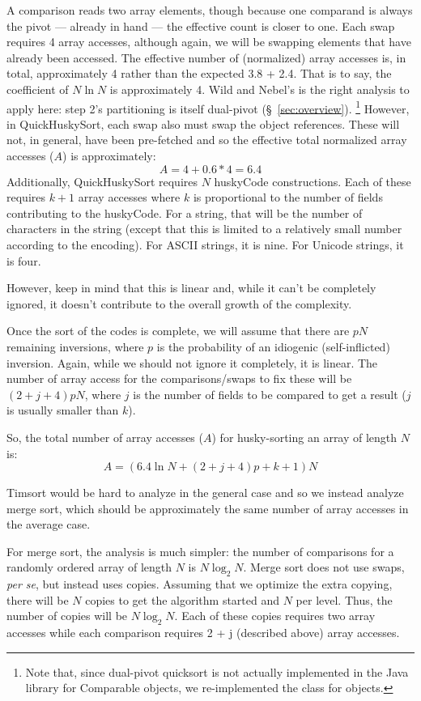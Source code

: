 \documentclass[twoside,leqno,twocolumn]{article}
\begin{document}
A comparison reads two array elements, though because one comparand is always the pivot --- already
in hand --- the effective count is closer to one.
Each swap requires 4 array accesses, although again, we will be swapping elements that have already been accessed.
The effective number of (normalized) array accesses is, in total, approximately 4 rather than the expected 3.8 + 2.4.
That is to say, the coefficient of $N \ln N$ is approximately 4.
Wild and Nebel's is the right analysis to apply here: step 2's partitioning is itself dual-pivot
(\S~\ref{sec:overview}).
\footnote{Note that, since dual-pivot quicksort is not actually implemented in the Java library for Comparable objects,
    we re-implemented the class for objects.}
However, in QuickHuskySort, each swap also must swap the object references.
These will not, in general, have been pre-fetched and so the effective total normalized array accesses ($A$) is approximately:
\[A = 4 + 0.6 * 4 = 6.4\]
Additionally, QuickHuskySort requires $N$ huskyCode constructions.
Each of these requires $k+1$ array accesses where $k$ is proportional to the number of fields contributing to the huskyCode.
For a string,
that will be the number of characters in the string (except that this is limited to a relatively small number according to the encoding).
For ASCII strings, it is nine.
For Unicode strings, it is four.

However, keep in mind that this is linear and, while it can’t be completely ignored,
it doesn't contribute to the overall growth of the complexity.

Once the sort of the codes is complete, we will assume that there are $p N$ remaining inversions,
where $p$ is the probability of an idiogenic (self-inflicted) inversion.
Again, while we should not ignore it completely, it is linear.
The number of array access for the comparisons/swaps to fix these will be $(2 + j + 4) p N$,
where $j$ is the number of fields to be compared to get a result ($j$ is usually smaller than $k$).

So, the total number of array accesses ($A$) for husky-sorting an array of length $N$ is:
\[A = (6.4 \ln N + (2 + j + 4) p + k + 1) N\]
   
Timsort would be hard to analyze in the general case and so we instead analyze merge sort,
which should be approximately the same number of array accesses in the average case.
 
For merge sort, the analysis is much simpler:
the number of comparisons for a randomly ordered array of length $N$ is $N \log_2 N$.
Merge sort does not use swaps, \emph{per se}, but instead uses copies.
Assuming that we optimize the extra copying, there will be $N$ copies to get the algorithm started and $N$ per level.
Thus, the number of copies will be $N {\log_2 N}$.
Each of these copies requires two array accesses while each comparison requires 2 + j (described above) array accesses.
 
\end{document}
